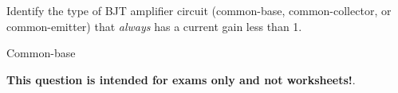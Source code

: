 

Identify the type of BJT amplifier circuit (common-base, common-collector, or common-emitter) that {\it always} has a current gain less than 1.







Common-base







{\bf This question is intended for exams only and not worksheets!}.




